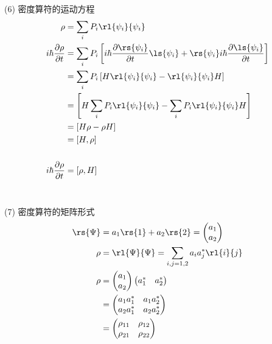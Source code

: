 \begin{frame} 
\frametitle{}
   (6) 密度算符的运动方程
   \[ \begin{aligned}
    \rho &= \sum_i P_i\rl{\psi_i}{\psi_i}  \\
     i \hbar \frac{\partial \rho}{\partial t} &= \sum_i P_i \left[i \hbar\frac{\partial \rs{\psi_i}}{\partial t}\ls{\psi_i}+ \rs{\psi_i}i \hbar\frac{\partial \ls{\psi_i}}{\partial t}\right] \\ 
     &=  \sum_i P_i \left[ H \rl{\psi_i}{\psi_i} -  \rl{\psi_i}{\psi_i} H \right] \\ 
     &=   \left[ H \sum_i P_i\rl{\psi_i}{\psi_i} - \sum_i P_i \rl{\psi_i}{\psi_i} H \right] \\ 
     &= [H \rho- \rho H] \\ 
     &= [H, \rho] \\ 
     ~\\ 
     i \hbar \frac{\partial \rho}{\partial t} & = [\rho, H]
   \end{aligned}\] 
\end{frame}

\begin{frame} 
\frametitle{}
~\\
    (7) 密度算符的矩阵形式
    \[ \begin{aligned}
       \rs{\Psi} & = a_1\rs{1} + a_2\rs{2} =  \begin{pmatrix}
        a_1  \\
        a_2 
    \end{pmatrix} \\
       \rho & = \rl{\Psi}{\Psi}  = \sum_{i,j=1,2} a_i a_j ^* \rl{i} {j}\\
       \rho & = \begin{pmatrix}
        a_1  \\
        a_2 
    \end{pmatrix} \begin{pmatrix}
        a^* _1  &  a^* _2
    \end{pmatrix}\\
    &= \begin{pmatrix}
        a_1a_1 ^* & a_1a_2 ^*  \\
        a_2a_1 ^* & a_2a_2 ^*  
    \end{pmatrix} \\ 
    &= \begin{pmatrix}
        \rho_{11} & \rho_{12}  \\
        \rho_{21} & \rho_{22}  
    \end{pmatrix} \\ 
    \end{aligned}\]     
\end{frame}

